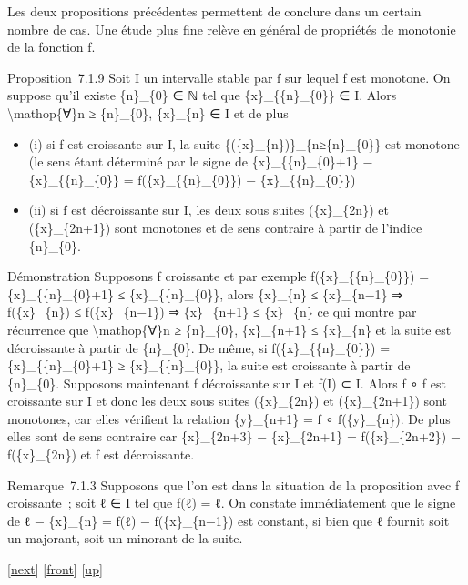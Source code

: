\documentclass[]{article}
\begin{document}
Les deux propositions précédentes permettent de conclure dans un certain
nombre de cas. Une étude plus fine relève en général de propriétés de
monotonie de la fonction f.

Proposition~7.1.9 Soit I un intervalle stable par f sur lequel f est
monotone. On suppose qu'il existe \{n\}\_\{0\} ∈ ℕ tel que
\{x\}\_\{\{n\}\_\{0\}\} ∈ I. Alors \textbackslash{}mathop\{∀\}n ≥
\{n\}\_\{0\}, \{x\}\_\{n\} ∈ I et de plus

\begin{itemize}
\itemsep1pt\parskip0pt
\item
  (i) si f est croissante sur I, la suite
  \{(\{x\}\_\{n\})\}\_\{n≥\{n\}\_\{0\}\} est monotone (le sens étant
  déterminé par le signe de \{x\}\_\{\{n\}\_\{0\}+1\} −
  \{x\}\_\{\{n\}\_\{0\}\} = f(\{x\}\_\{\{n\}\_\{0\}\}) −
  \{x\}\_\{\{n\}\_\{0\}\})
\item
  (ii) si f est décroissante sur I, les deux sous suites (\{x\}\_\{2n\})
  et (\{x\}\_\{2n+1\}) sont monotones et de sens contraire à partir de
  l'indice \{n\}\_\{0\}.
\end{itemize}

Démonstration Supposons f croissante et par exemple
f(\{x\}\_\{\{n\}\_\{0\}\}) = \{x\}\_\{\{n\}\_\{0\}+1\} ≤
\{x\}\_\{\{n\}\_\{0\}\}, alors \{x\}\_\{n\} ≤ \{x\}\_\{n−1\} ⇒
f(\{x\}\_\{n\}) ≤ f(\{x\}\_\{n−1\}) ⇒ \{x\}\_\{n+1\} ≤ \{x\}\_\{n\} ce
qui montre par récurrence que \textbackslash{}mathop\{∀\}n ≥
\{n\}\_\{0\}, \{x\}\_\{n+1\} ≤ \{x\}\_\{n\} et la suite est décroissante
à partir de \{n\}\_\{0\}. De même, si f(\{x\}\_\{\{n\}\_\{0\}\}) =
\{x\}\_\{\{n\}\_\{0\}+1\} ≥ \{x\}\_\{\{n\}\_\{0\}\}, la suite est
croissante à partir de \{n\}\_\{0\}. Supposons maintenant f décroissante
sur I et f(I) ⊂ I. Alors f ∘ f est croissante sur I et donc les deux
sous suites (\{x\}\_\{2n\}) et (\{x\}\_\{2n+1\}) sont monotones, car
elles vérifient la relation \{y\}\_\{n+1\} = f ∘ f(\{y\}\_\{n\}). De
plus elles sont de sens contraire car \{x\}\_\{2n+3\} − \{x\}\_\{2n+1\}
= f(\{x\}\_\{2n+2\}) − f(\{x\}\_\{2n\}) et f est décroissante.

Remarque~7.1.3 Supposons que l'on est dans la situation de la
proposition avec f croissante~; soit ℓ ∈ I tel que f(ℓ) = ℓ. On constate
immédiatement que le signe de ℓ − \{x\}\_\{n\} = f(ℓ) −
f(\{x\}\_\{n−1\}) est constant, si bien que ℓ fournit soit un majorant,
soit un minorant de la suite.

{[}\href{coursse36.html}{next}{]} {[}\href{coursse35.html}{front}{]}
{[}\href{coursch8.html\#coursse35.html}{up}{]}
\end{document}
